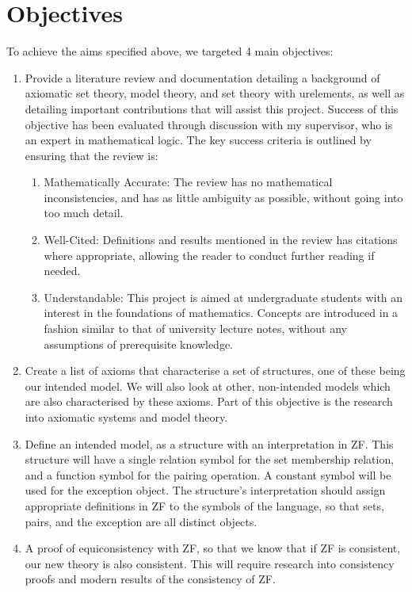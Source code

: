 \documentclass[11pt]{report}
\theoremstyle{definition}
\theoremstyle{theorem}
\theoremstyle{lemma}
\begin{document}
\section{Objectives}
To achieve the aims specified above, we targeted 4 main objectives:
\begin{enumerate}
  \item Provide a literature review and documentation detailing a background of axiomatic set theory, model theory, and set theory with urelements, as well as detailing important contributions that will assist this project.
  Success of this objective has been evaluated through discussion with my supervisor, who is an expert in mathematical logic. 
  The key success criteria is outlined by ensuring that the review is:
  \begin{enumerate}
    \item Mathematically Accurate: The review has no mathematical inconsistencies, and has as little ambiguity as possible, without going into too much detail. 
    \item Well-Cited: Definitions and results mentioned in the review has citations where appropriate, allowing the reader to conduct further reading if needed. 
    \item Understandable: This project is aimed at undergraduate students with an interest in the foundations of mathematics. Concepts are introduced in a fashion similar to that of university lecture notes, without any assumptions of prerequisite knowledge. 
  \end{enumerate} 

  \item Create a list of axioms that characterise a set of structures, one of these being our intended model.
  We will also look at other, non-intended models which are also characterised by these axioms.
  Part of this objective is the research into axiomatic systems and model theory.

  \item Define an intended model, as a structure with an interpretation in ZF. This structure will have a single relation symbol for the set membership relation, and a function symbol for the pairing operation.
  A constant symbol will be used for the exception object.
  The structure's interpretation should assign appropriate definitions in ZF to the symbols of the language, so that sets, pairs, and the exception are all distinct objects.

  \item A proof of equiconsistency with ZF, so that we know that if ZF is consistent, our new theory is also consistent.
  This will require research into consistency proofs and modern results of the consistency of ZF.
\end{enumerate}
\end{document}
